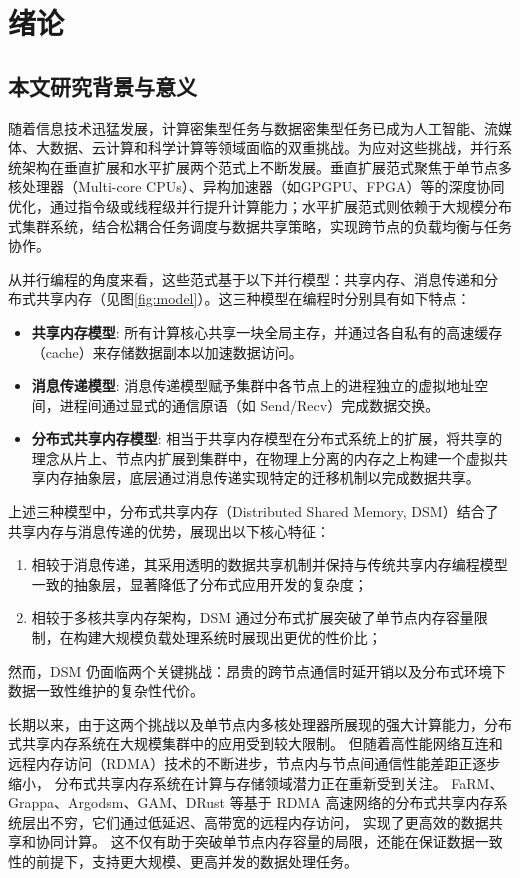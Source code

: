 \chapter{绪论}\label{chap:introduction}{
  \section{本文研究背景与意义}
  随着信息技术迅猛发展，计算密集型任务与数据密集型任务已成为人工智能、流媒体、大数据、云计算和科学计算等领域面临的双重挑战。为应对这些挑战，并行系统架构在垂直扩展和水平扩展两个范式上不断发展。垂直扩展范式聚焦于单节点多核处理器（Multi-core CPUs）、异构加速器（如GPGPU、FPGA）等的深度协同优化，通过指令级或线程级并行提升计算能力；水平扩展范式则依赖于大规模分布式集群系统，结合松耦合任务调度与数据共享策略，实现跨节点的负载均衡与任务协作。

  从并行编程的角度来看，这些范式基于以下并行模型：共享内存、消息传递和分
  布式共享内存（见图\ref{fig:model}）。这三种模型在编程时分别具有如下特点：
  \begin{itemize}
    \item \textbf{共享内存模型}: 所有计算核心共享一块全局主存，并通过各自私有的高速缓存（cache）来存储数据副本以加速数据访问。
    \item \textbf{消息传递模型}: 消息传递模型赋予集群中各节点上的进程独立的虚拟地址空间，进程间通过显式的通信原语（如 Send/Recv）完成数据交换。
    \item \textbf{分布式共享内存模型}: 相当于共享内存模型在分布式系统上的扩展，将共享的理念从片上、节点内扩展到集群中，在物理上分离的内存之上构建一个虚拟共享内存抽象层，底层通过消息传递实现特定的迁移机制以完成数据共享。
  \end{itemize}

  上述三种模型中，分布式共享内存（Distributed Shared Memory, DSM）结合了共享内存与消息传递的优势，展现出以下核心特征：
  \begin{enumerate}[leftmargin=1em, align=left]
    \item 相较于消息传递，其采用透明的数据共享机制并保持与传统共享内存编程模型一致的抽象层，显著降低了分布式应用开发的复杂度；
    \item 相较于多核共享内存架构，DSM 通过分布式扩展突破了单节点内存容量限制，在构建大规模负载处理系统时展现出更优的性价比；
  \end{enumerate}

  然而，DSM 仍面临两个关键挑战：昂贵的跨节点通信时延开销以及分布式环境下数据一致性维护的复杂性代价。

  长期以来，由于这两个挑战以及单节点内多核处理器所展现的强大计算能力，分布式共享内存系统在大规模集群中的应用受到较大限制。
  但随着高性能网络互连和远程内存访问（RDMA）技术的不断进步，节点内与节点间通信性能差距正逐步缩小，
  分布式共享内存系统在计算与存储领域潜力正在重新受到关注。
  FaRM、Grappa、Argodsm、GAM、DRust 等基于 RDMA 高速网络的分布式共享内存系统层出不穷，它们通过低延迟、高带宽的远程内存访问，
  实现了更高效的数据共享和协同计算。
  这不仅有助于突破单节点内存容量的局限，还能在保证数据一致性的前提下，支持更大规模、更高并发的数据处理任务。

}
